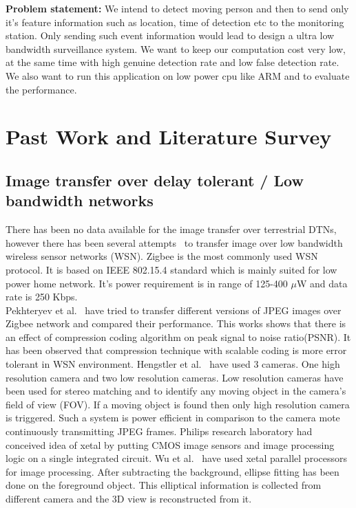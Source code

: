 \indent \textbf{Problem statement:} We intend to detect moving person
and then to send only it's feature information such as location, time of
detection etc to the monitoring station. Only sending such event
information would lead to design a ultra low bandwidth surveillance
system.  We want to keep our computation cost very low, at the same time
with high genuine detection rate and low false detection rate. We also
want to run this application on low power cpu like ARM and to evaluate
the performance.
\section{Past Work and Literature Survey}
\subsection{Image transfer over delay tolerant / Low bandwidth networks}
\indent There has been no data available for the image transfer over
terrestrial DTNs, however there has been several attempts~\cite{2, 3,
4, 5} to transfer image over low bandwidth wireless sensor networks
(WSN). Zigbee is the most commonly used WSN protocol. It is based on
IEEE 802.15.4 standard which is mainly suited for low power home
network. It's power requirement is in range of 125-400 $\mu$W and data
rate is 250 Kbps.\\
\indent Pekhteryev et al.~\cite{2} have tried to transfer different
versions of JPEG images over Zigbee network and compared their
performance. This works shows that there is an effect of compression
coding algorithm on peak signal to noise ratio(PSNR). It has been
observed that compression technique with scalable coding is more error
tolerant in WSN environment. Hengstler et al.~\cite{3, 5} have used 3
cameras. One high resolution camera and two low resolution cameras. Low
resolution cameras have been used for stereo matching and to identify
any moving object in the camera's field of view (FOV). If a moving
object is found then only high resolution camera is triggered. Such a
system is power efficient in  comparison to the camera mote continuously
transmitting JPEG frames. Philips research laboratory had conceived idea
of xetal by putting CMOS image sensors and image processing logic on a
single integrated circuit. Wu et al.~\cite{4} have used xetal parallel
processors for image processing. After subtracting the background,
ellipse fitting has been done on the foreground object. This elliptical
information is collected from different camera and the 3D view is
reconstructed from it.


